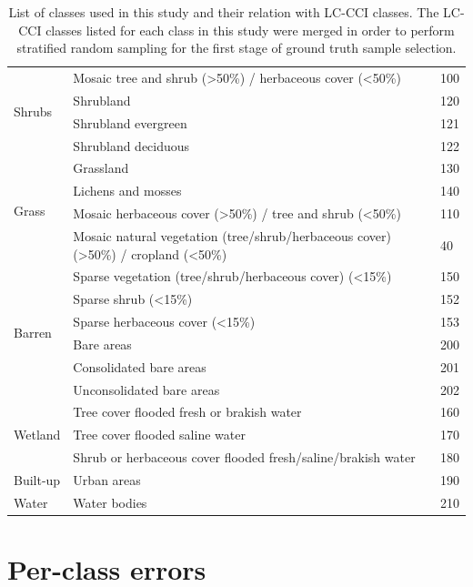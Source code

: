 \documentclass[a4paper,12pt]{scrbook}
\begin{document}
\begin{appendices}
\begin{table}[!ht]
\begin{center}
\begin{adjustbox}{totalheight=\baselineskip}
\begin{tabular}{lp{10.5cm}l}
	\hline
	\multirow{4}{*}{Shrubs} & Mosaic tree and shrub (>50\%) / herbaceous cover (<50\%) & 100 \\
	  & Shrubland & 120 \\
	  & Shrubland evergreen & 121 \\
	  & Shrubland deciduous & 122 \\
	\hline
	\multirow{4}{*}{Grass} & Grassland & 130 \\
	  & Lichens and mosses & 140 \\
	  & Mosaic herbaceous cover (>50\%) / tree and shrub (<50\%) & 110 \\
	  & Mosaic natural vegetation (tree/shrub/herbaceous cover) (>50\%) / cropland (<50\%) & 40 \\
	\hline
	\multirow{6}{*}{Barren} & Sparse vegetation (tree/shrub/herbaceous cover) (<15\%) & 150 \\
	  & Sparse shrub (<15\%) & 152 \\
	  & Sparse herbaceous cover (<15\%) & 153 \\
	  & Bare areas & 200 \\
	  & Consolidated bare areas & 201 \\
	  & Unconsolidated bare areas & 202 \\
	\hline
	\multirow{3}{*}{Wetland} & Tree cover flooded fresh or brakish water & 160 \\
	  & Tree cover flooded saline water & 170 \\
	  & Shrub or herbaceous cover flooded fresh/saline/brakish water & 180 \\
	\hline
	Built-up & Urban areas & 190 \\
	\hline
	Water & Water bodies & 210 \\
	\hline
      \end{tabular}
    \end{adjustbox}
  \end{center}
  \caption{List of classes used in this study and their relation with LC-CCI classes. The LC-CCI classes listed for each class in this study were merged in order to perform stratified random sampling for the first stage of ground truth sample selection.}
  \label{tbl-classes}
 \end{table}
 
 \chapter{Per-class errors}

\end{appendices}
\end{document}
